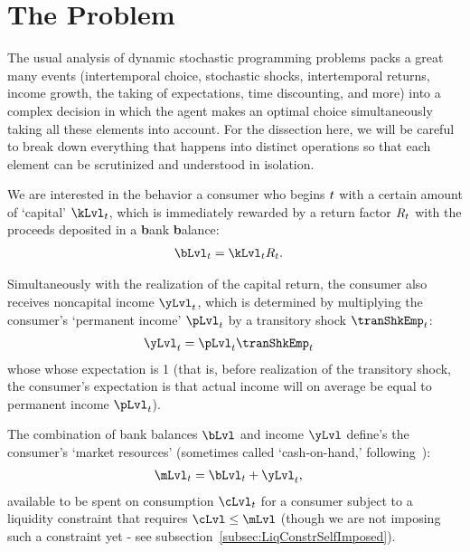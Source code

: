 
\hypertarget{the-problem}{}
\section{The Problem}\label{sec:the-problem}

The usual analysis of dynamic stochastic programming problems packs a great many events (intertemporal choice, stochastic shocks, intertemporal returns, income growth, the taking of expectations, time discounting, and more) into a complex decision in which the agent makes an optimal choice simultaneously taking all these elements into account. For the dissection here, we will be careful to break down everything that happens into distinct operations so that each element can be scrutinized and understood in isolation.

We are interested in the behavior a consumer who begins {\interval} $t$ with a certain amount of `capital' $\kLvl_{\prd}$, which is immediately rewarded by a return factor $R_{t}$  with the proceeds deposited in a \textbf{b}ank \textbf{b}alance:
\begin{equation}\begin{gathered}\begin{aligned}\label{eq:bLvl}
      \bLvl_{\prd} & = \kLvl_{\prd}\Rfree_{\prd}. 
    \end{aligned}\end{gathered}\end{equation}

Simultaneously with the realization of the capital return, the consumer also receives noncapital income $\yLvl_{\prd}$, which is determined by multiplying the consumer's `permanent income' $\pLvl_{\prd}$ by a transitory shock $\tranShkEmp_{\prd}$:
\begin{equation}\begin{gathered}\begin{aligned}
      \yLvl_{\prd} & = \pLvl_{\prd}\tranShkEmp_{\prd} \label{eq:yLvl}
    \end{aligned}\end{gathered}\end{equation}
whose whose expectation is 1 (that is, before realization of the transitory shock, the consumer's expectation is that actual income will on average be equal to permanent income $\pLvl_{\prd}$).

The combination of bank balances $\bLvl$ and income $\yLvl$ define's the consumer's `market resources' (sometimes called `cash-on-hand,' following~\cite{deatonUnderstandingC}):
\begin{equation}\begin{gathered}\begin{aligned}
      \mLvl_{\prd} & = \bLvl_{\prd}+\yLvl_{\prd} \label{eq:mLvl},
    \end{aligned}\end{gathered}\end{equation}
available to be spent on consumption $\cLvl_{\prd}$ for a consumer subject to a liquidity constraint that requires $\cLvl \leq \mLvl$ (though we are not imposing such a constraint yet - see subsection~\ref{subsec:LiqConstrSelfImposed}).

